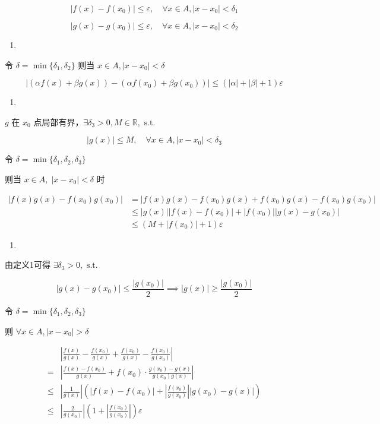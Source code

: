 \[
|f(x)-f(x_{0})|\leq\varepsilon, \quad \forall x \in A, |x-x_{0}|<\delta_{1}
\]

\[
|g(x)-g(x_{0})| \leq \varepsilon, \quad \forall x \in A, |x-x_{0}|< \delta_{2}
\]

\begin{enumerate}
\def\labelenumi{\arabic{enumi}.}
\tightlist
\item
\end{enumerate}

令 \(\delta=\min \{ \delta_{1},\delta_{2} \}\) 则当
\(x \in A, |x-x_{0}|<\delta\)

\[
|(\alpha f(x)+\beta g(x))-(\alpha f(x_{0})+\beta g(x_{0}))|\leq(|\alpha|+|\beta|+1)\varepsilon
\]

\begin{enumerate}
\def\labelenumi{\arabic{enumi}.}
\setcounter{enumi}{1}
\tightlist
\item
\end{enumerate}

\(g\) 在 \(x_{0}\)
点局部有界，\(\exists \delta_{3}>0, M \in \mathbb{R},\text{ s.t.}\)

\[
|g(x)|\leq M, \quad \forall x \in A, |x-x_{0}|<\delta_{3}
\]

令 \(\delta=\min\{ \delta_{1},\delta_{2},\delta_{3} \}\)

则当 \(x \in A, \; |x-x_{0}|<\delta\) 时

\[
\begin{aligned}
|f(x)g(x)-f(x_{0})g(x_{0})| &=|f(x)g(x)-f(x_{0})g(x)+f(x_{0})g(x)-f(x_{0})g(x_{0})| \\
&\leq |g(x)||f(x)-f(x_{0})|+|f(x_{0})||g(x)-g(x_{0})|\\
&\leq (M+|f(x_{0})|+1)\varepsilon
\end{aligned}
\]

\begin{enumerate}
\def\labelenumi{\arabic{enumi}.}
\setcounter{enumi}{2}
\tightlist
\item
\end{enumerate}

由定义1可得 \(\exists \delta_{3} > 0,\text{ s.t.}\)

\[
|g(x)-g(x_{0})|\leq \frac{|g(x_{0})|}{2} \implies |g(x)|\geq \frac{|g(x_{0})|}{2}
\]

令 \(\delta=\min\{ \delta_{1},\delta_{2},\delta_{3} \}\)

则 \(\forall x \in A, |x-x_{0}|>\delta\)

\[
\begin{aligned}
&\left|\frac{f(x)}{g(x)}-\frac{f(x_{0})}{g(x)}+\frac{f(x_{0})}{g(x)}-\frac{f(x_{0})}{g(x_{0})}\right| \\
= &\left| \frac{f(x)-f(x_{0})}{g(x)}+f(x_{0})\cdot \frac{g(x_{0})-g(x)}{g(x_{0})g(x)}\right|\\
\leq &  \left|  \frac{1}{g(x)}\right| \left(|f(x)-f(x_{0})|+\left| \frac{f(x_{0})}{g(x_{0})}\right| |g(x_{0})-g(x)|\right) \\
\leq & \left| \frac{2}{g(x_{0})}\right| \left(1+\left| \frac{f(x_{0})}{g(x_{0})}\right|\right) \varepsilon
\end{aligned}
\]

